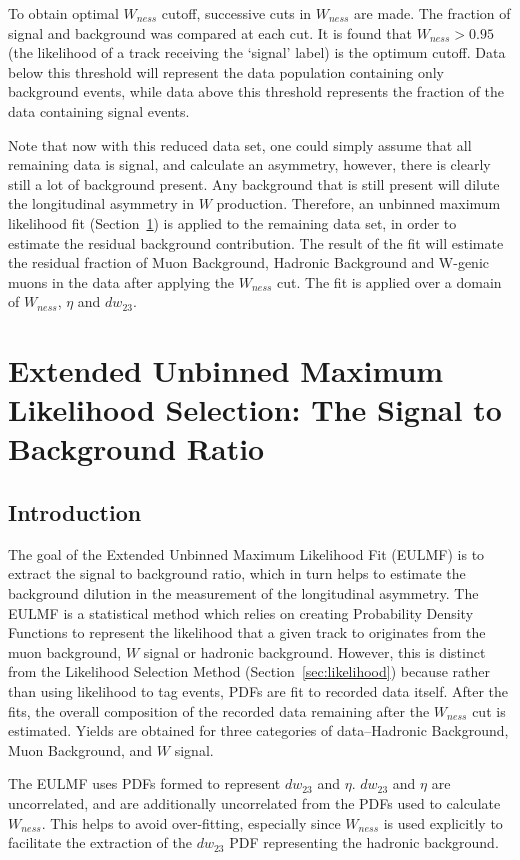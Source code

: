 To obtain optimal $W_{ness}$ cutoff, successive cuts in $W_{ness}$ are made. The
fraction of signal and background was compared at each cut. It is found that
$W_{ness} > 0.95$ (the likelihood of a track receiving the `signal' label) is
the optimum cutoff. Data below this threshold will represent the data population
containing only background events, while data above this threshold represents
the fraction of the data containing signal events.

Note that now with this reduced data set, one could simply assume that all
remaining data is signal, and calculate an asymmetry, however, there is clearly
still a lot of background present. Any background that is still present will
dilute the longitudinal asymmetry in $W$ production. Therefore, an unbinned
maximum likelihood fit (Section~\ref{sec:sbr}) is applied to the remaining data
set, in order to estimate the residual background contribution. The result of
the fit will estimate the residual fraction of Muon Background, Hadronic
Background and W-genic muons in the data after applying the $W_{ness}$ cut.  The
fit is applied over a domain of $W_{ness}$, $\eta$ and $dw_{23}$. 

\clearpage
\section{Extended Unbinned Maximum Likelihood Selection: The Signal to
Background Ratio}
\label{sec:sbr}

\subsection{Introduction}
The goal of the Extended Unbinned Maximum Likelihood Fit (EULMF) is to extract
the signal to background ratio, which in turn helps to estimate the background
dilution in the measurement of the longitudinal asymmetry. The EULMF is a
statistical method which relies on creating Probability Density Functions to
represent the likelihood that a given track to originates from the muon
background, $W$ signal or hadronic background. However, this is distinct from
the Likelihood Selection Method (Section~\ref{sec:likelihood}) because rather
than using likelihood to tag events, PDFs are fit to recorded data itself.
After the fits, the overall composition of the recorded data remaining after the
$W_{ness}$ cut is estimated. Yields are obtained for three categories of
data--Hadronic Background, Muon Background, and $W$ signal. 

The EULMF uses PDFs formed to represent $dw_{23}$ and $\eta$. $dw_{23}$ and
$\eta$ are uncorrelated, and are additionally uncorrelated from the PDFs used to
calculate $W_{ness}$. This helps to avoid over-fitting, especially since
$W_{ness}$ is used explicitly to facilitate the extraction of the $dw_{23}$ PDF
representing the hadronic background. 

